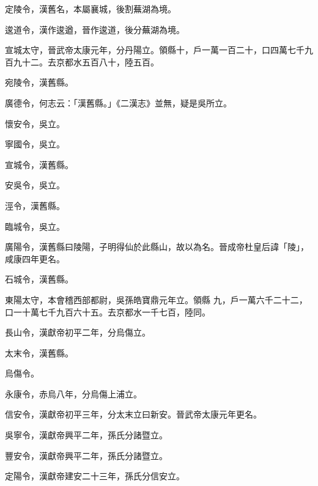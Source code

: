 \begin{pinyinscope}
 定陵令，漢舊名，本屬襄城，後割蕪湖為境。



 逡道令，漢作逡遒，晉作逡道，後分蕪湖為境。



 宣城太守，晉武帝太康元年，分丹陽立。領縣十，戶一萬一百二十，口四萬七千九百九十二。去京都水五百八十，陸五百。



 宛陵令，漢舊縣。



 廣德令，何志云：「漢舊縣。」《二漢志》並無，疑是吳所立。



 懷安令，吳立。



 寧國令，吳立。



 宣城令，漢舊縣。



 安吳令，吳立。



 涇令，漢舊縣。



 臨城令，吳立。



 廣陽令，漢舊縣曰陵陽，子明得仙於此縣山，故以為名。晉成帝杜皇后諱「陵」，咸康四年更名。



 石城令，漢舊縣。



 東陽太守，本會稽西部都尉，吳孫皓寶鼎元年立。領縣
 九，戶一萬六千二十二，口一十萬七千九百六十五。去京都水一千七百，陸同。



 長山令，漢獻帝初平二年，分烏傷立。



 太末令，漢舊縣。



 烏傷令。



 永康令，赤烏八年，分烏傷上浦立。



 信安令，漢獻帝初平三年，分太末立曰新安。晉武帝太康元年更名。



 吳寧令，漢獻帝興平二年，孫氏分諸暨立。



 豐安令，漢獻帝興平二年，孫氏分諸暨立。



 定陽令，漢獻帝建安二十三年，孫氏分信安立。




\end{pinyinscope}
